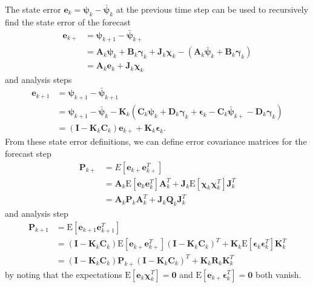 The state error $\boldsymbol{e}_k = \boldsymbol{\psi}_k - \bar{\boldsymbol{\psi}}_k$ at the previous time step can be used to recursively find the state error of the forecast
\begin{equation}
\begin{split}
\boldsymbol{e}_{k+} &= \boldsymbol{\psi}_{k+1} - \bar{\boldsymbol{\psi}}_{k+}\\
&= \mathbf{A}_k \boldsymbol{\psi}_k + \mathbf{B}_k \boldsymbol{\gamma}_k + \mathbf{J}_k\boldsymbol{\chi}_k - \left(\mathbf{A}_k \bar{\boldsymbol{\psi}}_k + \mathbf{B}_k \boldsymbol{\gamma}_k\right)\\
&= \mathbf{A}_k \boldsymbol{e}_k + \mathbf{J}_k\boldsymbol{\chi}_k
\end{split}
\end{equation}
and analysis steps
\begin{equation}
\begin{split}
\boldsymbol{e}_{k+1} &= \boldsymbol{\psi}_{k+1} - \bar{\boldsymbol{\psi}}_{k+1}\\
&= \boldsymbol{\psi}_{k+1} - \bar{\boldsymbol{\psi}}_k - \mathbf{K}_k(\mathbf{C}_k\boldsymbol{\psi}_k + \mathbf{D}_k\boldsymbol{\gamma}_k + \boldsymbol{\epsilon}_k -  \mathbf{C}_k\bar{\boldsymbol{\psi}}_{k+} - \mathbf{D}_k\boldsymbol{\gamma}_k )\\
&= (\mathbf{I} - \mathbf{K}_k\mathbf{C}_k) \boldsymbol{e}_{k+} + \mathbf{K}_k \boldsymbol{\epsilon}_k.
\end{split}
\end{equation}
From these state error definitions, we can define error covariance matrices for the forecast step
\begin{equation}
\begin{split}
\mathbf{P}_{k+} &= E\left[ \boldsymbol{e}_{k+} \boldsymbol{e}_{k+}^T \right] \\
&= \mathbf{A}_k \mathrm{E}[\boldsymbol{e}_k  \boldsymbol{e}_k^T]\mathbf{A}_k^T + \mathbf{J}_k \mathrm{E}[\boldsymbol{\chi}_k  \boldsymbol{\chi}_k^T]\mathbf{J}_k^T \\
&= \mathbf{A}_k \mathbf{P}_k \mathbf{A}_k^T + \mathbf{J}_k  \mathbf{Q}_k \mathbf{J}_k^T 
\end{split}
\end{equation}
and analysis step
\begin{equation}
\begin{split}
\mathbf{P}_{k+1} &= \mathrm{E} \left[ \boldsymbol{e}_{k+1} \boldsymbol{e}_{k+1}^T \right] \\
&=  (\mathbf{I} - \mathbf{K}_k\mathbf{C}_k) \mathrm{E}[\boldsymbol{e}_{k+} \boldsymbol{e}_{k+}^T]  (\mathbf{I} - \mathbf{K}_k\mathbf{C}_k)^T + \mathbf{K}_k \mathrm{E}[\boldsymbol{\epsilon}_k \boldsymbol{\epsilon}_k^T] \mathbf{K}_k^T\\
&=  (\mathbf{I} - \mathbf{K}_k\mathbf{C}_k) \mathbf{P}_{k+}  (\mathbf{I} - \mathbf{K}_k\mathbf{C}_k)^T + \mathbf{K}_k \mathbf{R}_k \mathbf{K}_k^T
\end{split}
\end{equation}
by noting that the expectations $\mathrm{E}[\boldsymbol{e}_k\boldsymbol{\chi}_k^T] = \mathbf{0}$ and $\mathrm{E}[\boldsymbol{e}_{k+}\boldsymbol{\epsilon}_k^T] = \mathbf{0}$ both vanish.

